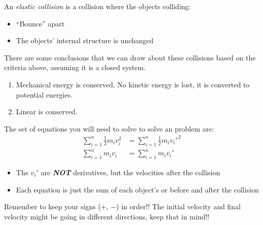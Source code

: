 \begin{definition} \label{def:Elastic Collision}
  An \emph{elastic collision} is a collision where the objects colliding:

  \begin{itemize}[noitemsep, nolistsep]
    \item ``Bounce'' apart
    \item The objects' internal structure is unchanged
  \end{itemize}

  There are some conclusions that we can draw about these collisions based on the criteria above, assuming it is a closed system.
  \begin{enumerate}
    \item Mechanical energy is conserved. No kinetic energy is lost, it is converted to potential energies.
    \item Linear  is conserved.
  \end{enumerate}

  The set of equations you will need to solve to solve an  problem are:
  \begin{equation} \label{eq:Elastic Collision}
    \begin{aligned}
      \sum\limits_{i=1}^{n} \frac{1}{2} m_{i}v_{i}^{2} &= \sum\limits_{i=1}^{n} \frac{1}{2} m_{i}v_{i}'^{\,2} \\
      \sum\limits_{i=1}^{n} m_{i}v_{i} &= \sum\limits_{i=1}^{n} m_{i}v_{i}'
    \end{aligned}
  \end{equation}

  \begin{itemize}[noitemsep, nolistsep]
    \item The $v_{i}'$ are \textbf{\emph{NOT}} derivatives, but the velocities after the collision
    \item Each equation is just the sum of each object's  or  before and after the collision
  \end{itemize}

  \begin{remark}
    Remember to keep your signs ($+$, $-$) in order!!
    The initial velocity and final velocity might be going in different directions, keep that in mind!!
  \end{remark}
\end{definition}


